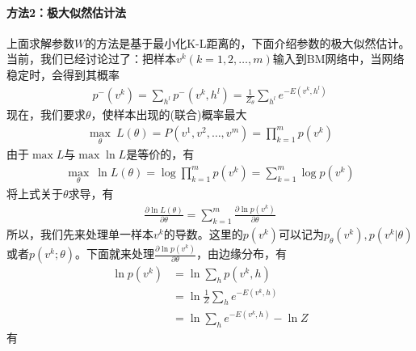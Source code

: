             \paragraph{方法2：极大似然估计法} 上面求解参数$W$的方法是基于最小化K-L距离的，下面介绍参数的极大似然估计。当前，我们已经讨论过了：把样本$v^k(k=1,2,\dots,m)$输入到BM网络中，当网络稳定时，会得到其概率
            \begin{align*}
            p^-(v^k) = \sum_{h^l}p^-(v^k,h^l) = \frac{1}{Z_\theta} \sum_{h^l}e^{-E(v^k,h^l)}
            \end{align*}
            现在，我们要求$\theta$，使样本出现的(联合)概率最大
            \begin{align*}
            \max_\theta\ L(\theta) = P(v^1,v^2,\dots,v^m) = \prod_{k=1}^mp(v^k)
            \end{align*}
            由于$\max L$与$\max \ln L$是等价的，有
            \begin{align*}
            \max_\theta \ \ln L(\theta)=\log\prod_{k=1}^mp(v^k) = \sum_{k=1}^m\log p(v^k)
            \end{align*}
            将上式关于$\theta$求导，有
            \begin{align*}
            \frac{\partial \ln L(\theta)}{\partial \theta} = \sum_{k=1}^m \frac{\partial \ln p(v^k)}{\partial \theta}
            \end{align*}
            所以，我们先来处理单一样本$v^k$的导数。这里的$p(v^k)$可以记为$p_\theta(v^k),p(v^k|\theta)$或者$p(v^k;\theta)$。下面就来处理$\frac{\partial \ln p(v^k)}{\partial \theta}$，由边缘分布，有
            \begin{align*}
            \ln p(v^k) & = \ln \sum_h p(v^k,h)\\
            & =\ln \frac{1}{Z} \sum_h e^{-E(v^k,h)}\\
            & =\ln \sum_he^{-E(v^k,h)} -\ln Z
            \end{align*}
            有
